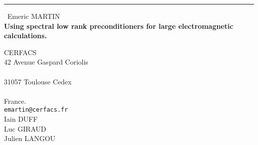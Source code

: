 \documentclass{report}
\begin{document}
\begin{center}
\rule{6in}{1pt} \
{\large Emeric MARTIN \\
{\bf Using spectral low rank preconditioners for large electromagnetic calculations.}}

CERFACS \\ 42 Avenue Gaspard Coriolis \\ \\ 31057 Toulouse Cedex \\ \\ France.
\\
{\tt emartin@cerfacs.fr}\\
Iain DUFF\\
Luc GIRAUD\\
	Julien LANGOU\end{center}
\end{document}
